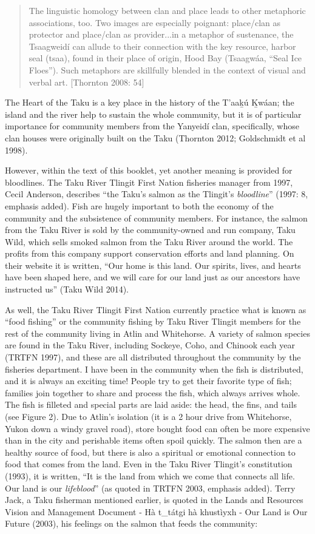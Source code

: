 \begin{quote}
The linguistic homology between clan and place leads to other metaphoric associations, too. Two images are especially poignant: place/clan as protector and place/clan as provider...in a metaphor of sustenance, the Tsaagweidí can allude to their connection with the key resource, harbor seal (tsaa), found in their place of origin, Hood Bay (Tsaagwáa, “Seal Ice Floes”). Such metaphors are skillfully blended in the context of visual and verbal art. [Thornton 2008: 54]
\end{quote}

The Heart of the Taku is a key place in the history of the T'aak̲ú K̲wáan; the island and the river help to sustain the whole community, but it is of particular importance for community members from the Yanyeidí clan, specifically, whose clan houses were originally built on the Taku (Thornton 2012; Goldschmidt et al 1998).

However, within the text of this booklet, yet another meaning is provided for bloodlines. The Taku River Tlingit First Nation fisheries manager from 1997, Cecil Anderson, describes “the Taku’s salmon as the Tlingit’s \textit{bloodline}” (1997: 8, emphasis added). Fish are hugely important to both the economy of the community and the subsistence of community members. For instance, the salmon from the Taku River is sold by the community-owned and run company, Taku Wild, which sells smoked salmon from the Taku River around the world. The profits from this company support conservation efforts and land planning. On their website it is written, “Our home is this land. Our spirits, lives, and hearts have been shaped here, and we will care for our land just as our ancestors have instructed us” (Taku Wild 2014).

As well, the Taku River Tlingit First Nation currently practice what is known as “food fishing” or the community fishing by Taku River Tlingit members for the rest of the community living in Atlin and Whitehorse. A variety of salmon species are found in the Taku River, including Sockeye, Coho, and Chinook each year (TRTFN 1997), and these are all distributed throughout the community by the fisheries department. I have been in the community when the fish is distributed, and it is always an exciting time! People try to get their favorite type of fish; families join together to share and process the fish, which always arrives whole. The fish is filleted and special parts are laid aside: the head, the fins, and tails (see Figure 2). Due to Atlin’s isolation (it is a 2 hour drive from Whitehorse, Yukon down a windy gravel road), store bought food can often be more expensive than in the city and perishable items often spoil quickly. The salmon then are a healthy source of food, but there is also a spiritual or emotional connection to food that comes from the land. Even in the Taku River Tlingit’s constitution (1993), it is written, “It is the land from which we come that connects all life. Our land is our \textit{lifeblood}” (as quoted in TRTFN 2003, emphasis added). Terry Jack, a Taku fisherman mentioned earlier, is quoted in the Lands and Resources Vision and Management Document - Hà t\_tátgi hà khustìyxh - Our Land is Our Future (2003), his feelings on the salmon that feeds the community:

